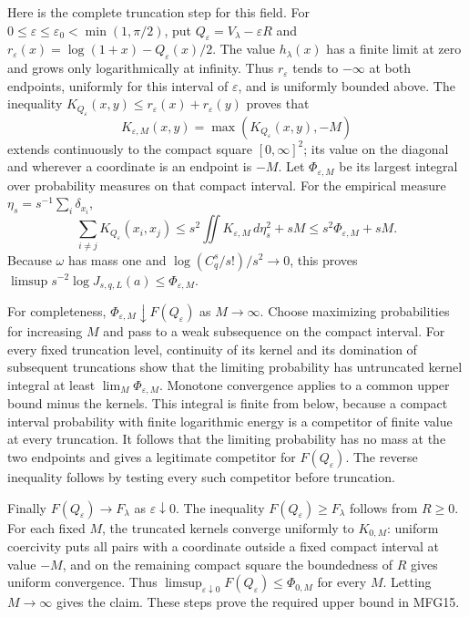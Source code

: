\documentclass[11pt,a4paper]{article}
\begin{document}
Here is the complete truncation step for this field. For
$0\le\varepsilon\le\varepsilon_0<\min(1,\pi/2)$, put
$Q_\varepsilon=V_\lambda-\varepsilon R$ and
$r_\varepsilon(x)=\log(1+x)-Q_\varepsilon(x)/2$.
The value $h_\lambda(x)$ has a finite limit at zero and grows only
logarithmically at infinity. Thus $r_\varepsilon$ tends to $-\infty$
at both endpoints, uniformly for this interval of $\varepsilon$,
and is uniformly bounded above. The inequality
$K_{Q_\varepsilon}(x,y)\le r_\varepsilon(x)+r_\varepsilon(y)$ proves
that
\[
 K_{\varepsilon,M}(x,y)=\max(K_{Q_\varepsilon}(x,y),-M)
\]
extends continuously to the compact square $[0,\infty]^2$; its value
on the diagonal and wherever a coordinate is an endpoint is $-M$.
Let $\Phi_{\varepsilon,M}$ be its largest integral over probability
measures on that compact interval. For the empirical measure
$\eta_s=s^{-1}\sum_i\delta_{x_i}$,
\[
 \sum_{i\ne j}K_{Q_\varepsilon}(x_i,x_j)
 \le s^2\iint K_{\varepsilon,M}\,d\eta_s^2+sM
 \le s^2\Phi_{\varepsilon,M}+sM.
\]
Because $\omega$ has mass one and
$\log(C_q^s/s!)/s^2\to0$, this proves
$\limsup s^{-2}\log J_{s,q,L}(a)\le\Phi_{\varepsilon,M}$.

For completeness,
$\Phi_{\varepsilon,M}\downarrow F(Q_\varepsilon)$ as $M\to\infty$.
Choose maximizing probabilities for increasing $M$ and pass to a weak
subsequence on the compact interval. For every fixed truncation level,
continuity of its kernel and its domination of subsequent truncations
show that the limiting probability has untruncated kernel integral at
least $\lim_M\Phi_{\varepsilon,M}$. Monotone convergence applies to
a common upper bound minus the kernels. This integral is finite from
below, because a compact interval probability with finite logarithmic
energy is a competitor of finite value at every truncation. It follows
that the limiting probability has no mass at the two endpoints and
gives a legitimate competitor for $F(Q_\varepsilon)$. The reverse
inequality follows by testing every such competitor before truncation.

Finally $F(Q_\varepsilon)\to F_\lambda$ as $\varepsilon\downarrow0$.
The inequality $F(Q_\varepsilon)\ge F_\lambda$ follows from $R\ge0$.
For each fixed $M$, the truncated kernels converge uniformly to
$K_{0,M}$: uniform coercivity puts all pairs with a coordinate outside
a fixed compact interval at value $-M$, and on the remaining compact
square the boundedness of $R$ gives uniform convergence. Thus
$\limsup_{\varepsilon\downarrow0}F(Q_\varepsilon)
\le\Phi_{0,M}$ for every $M$. Letting $M\to\infty$ gives the claim.
These steps prove the required upper bound in MFG15.
\end{document}
